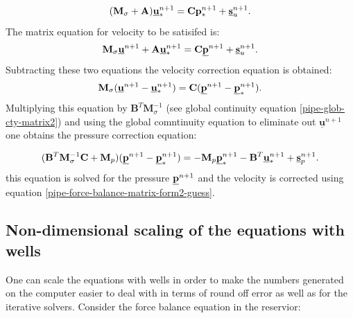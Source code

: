 \begin{equation}
({\mathbf M}_\sigma +{\mathbf A}) \underline{\bf u}^{n+1}_* = {\mathbf C} {\bf p}^{n+1}_* + \underline{\bf s}_u^{n+1}.
\label{pipe-force-balance-matrix-form2-guess}
\end{equation}
The matrix equation for velocity to be satisifed is:
\begin{equation}
{\mathbf M}_\sigma\underline{\bf u}^{n+1} +{\mathbf A} \underline{\bf u}^{n+1}_* = {\mathbf C} \underline{\bf p}^{n+1} + \underline{\bf s}_u^{n+1}.
\label{pipe-force-balance-matrix-form2-guess-2}
\end{equation}
Subtracting these two equations the
velocity correction equation is obtained:
\begin{equation}
{\mathbf M}_\sigma ( \underline{\bf u}^{n+1} -\underline{\bf u}^{n+1}_*)
= {\mathbf C} (\underline{\bf p}^{n+1} - \underline{\bf p}^{n+1}_*).
\label{pipe-force-balance-matrix-form2-guess}
\end{equation}
Multiplying this equation by ${\mathbf B}^T {\mathbf M}_\sigma^{-1}$
(see global continuity
equation \ref{pipe-glob-cty-matrix2}) and using the global comntinuity
equation to eliminate out $ \underline{\mathbf u}^{n+1} $ one obtains
the pressure correction equation:

\begin{equation}
({\mathbf B}^T {\mathbf M}_\sigma^{-1} {\mathbf C} + {\mathbf M}_p) (\underline{\bf p}^{n+1} - \underline{\bf p}^{n+1}_*)
= - {\mathbf M}_p \underline{\bf p}^{n+1}_* - {\mathbf B}^T \underline{\bf u}^{n+1}_* + \underline{\bf s}_p^{n+1}.
\end{equation}
this equation is solved for the pressure  $\underline{\bf p}^{n+1}$ and the
velocity is corrected using equation \ref{pipe-force-balance-matrix-form2-guess}.













\subsection{Non-dimensional scaling of the equations with wells}
\label{well-scaling}

One can scale the equations with wells in order to make the numbers generated on the
computer easier to deal with in terms of round off error as well as for the iterative
solvers.
Consider the force balance equation in the reservior:

